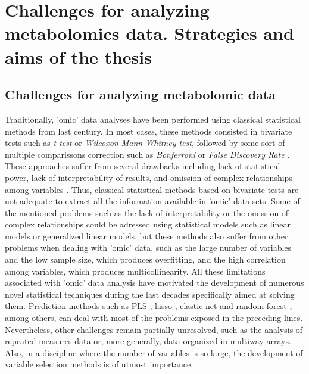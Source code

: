 \chapter[Challenges for analyzing metabolomics data. Strategies and aims of the thesis]{Challenges for analyzing metabolomics data. Strategies and aims of the thesis}
\label{chapter:challenges}

\section{Challenges for analyzing metabolomic data}
\label{sec:challengesmetabodata}
Traditionally, 'omic' data analyses have been performed using classical statistical methods from last century. In most cases, these methods consisted in bivariate tests such as \textit{t test} or \textit{Wilcoxon-Mann Whitney test}, followed by some sort of multiple comparissons correction such as \textit{Bonferroni} or \textit{False Discovery Rate} \parencite{hochberg1990more, benjamini1995controlling}. These approaches suffer from several drawbacks including lack of statistical power, lack of interpretability of results, and omission of complex relationships among variables \parencite{strasak2007statistical}. Thus, classical statistical methods based on bivariate tests are not adequate to extract all the information available in 'omic' data sets.
Some of the mentioned problems such as the lack of interpretability or the omission of complex relationships could be adressed using statistical models such as linear models or generalized linear models, but these methods also suffer from other problems when dealing with 'omic' data, such as the large number of variables and the low sample size, which produces overfitting, and the high correlation among variables, which produces multicollinearity. All these limitations associated with 'omic' data analysis have motivated the development of numerous novel statistical techniques during the last decades specifically aimed at solving them. Prediction methods such as PLS \parencite{wold1984collinearity}, lasso \parencite{tibshirani1996regression}, elastic net \parencite{zou2005regularization} and random forest \parencite{breiman2001random}, among others, can deal with most of the problems exposed in the preceding lines. Nevertheless, other challenges remain partially unresolved, such as the analysis of repeated measures data or, more generally, data organized in multiway arrays. Also, in a discipline where the number of variables is so large, the development of variable selection methods is of utmost importance.

